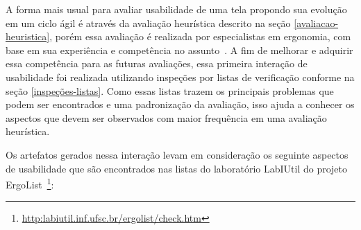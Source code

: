 %
A forma mais usual para avaliar usabilidade de uma tela propondo sua evolução em um ciclo ágil é através da avaliação heurística descrito na seção \ref{avaliacao-heuristica}, porém essa avaliação é realizada por especialistas em ergonomia, com base em sua experiência e competência no assunto~\cite{cybis2010}. A fim de melhorar e adquirir essa competência para as futuras avaliações, essa primeira interação de usabilidade foi realizada utilizando inspeções por listas de verificação conforme na seção \ref{inspeções-listas}. Como essas listas trazem os principais problemas que podem ser encontrados e uma padronização da avaliação, isso ajuda a conhecer os aspectos que devem ser observados com maior frequência em uma avaliação heurística.

Os artefatos gerados nessa interação levam em consideração os seguinte aspectos de usabilidade que são encontrados nas listas do laboratório LabIUtil do projeto
ErgoList~\footnote{\url{http:labiutil.inf.ufsc.br/ergolist/check.htm}}:


